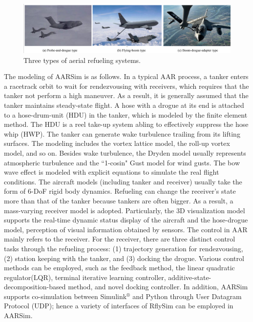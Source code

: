 \begin{figure}[th]
	\centering
	\includegraphics[width=1\textwidth]{Figures/Figs_Ch5/Fig1.pdf}
	\caption{Three types of aerial refueling systems.}\label{FIG_1}
\end{figure}

The modeling of AARSim is as follows. In a typical AAR process, a tanker enters a racetrack orbit to wait for rendezvousing with receivers, which requires that the tanker not perform a high maneuver. As a result, it is generally assumed that the tanker maintains steady-state flight. A hose with a drogue at its end is attached to a hose-drum-unit (HDU) in the tanker, which is modeled by the finite element method\cite{wei2016drogue}. The HDU is a reel take-up system abling to effectively suppress the hose whip (HWP)\cite{ro2011dynamics,wang2014dynamic,dai2019hose,wang2015dynamics}. The tanker can generate wake turbulence trailing from its lifting surfaces. The modeling includes the vortex lattice model, the roll-up vortex model, and so on. Besides wake turbulence, the Dryden\cite{moorhouse1980us} model usually represents atmospheric turbulence and the ``1-cosin" Gust model for wind gusts. The bow wave effect is modeled with explicit equations to simulate the real flight conditions\cite{wei2016drogue,dai2016modeling}. The aircraft models (including tanker and receiver) usually take the form of 6-DoF rigid body dynamics. Refueling can change the receiver's state more than that of the tanker because tankers are often bigger. As a result, a mass-varying receiver model is adopted\cite{ma2018formation}. Particularly, the 3D visualization model supports the real-time dynamic status display of the aircraft and the hose-drogue model, perception of visual\cite{arafat2023vision} information obtained by sensors\cite{parry2023review}. The control in AAR mainly refers to the receiver. For the receiver, there are three distinct control tasks through the refueling process: (1) trajectory generation for rendezvousing, (2) station keeping with the tanker, and (3) docking the drogue. Various control methods can be employed, such as the feedback method, the linear quadratic regulator(LQR), terminal iterative learning controller\cite{dai2018terminal,dai2018iterative}, additive-state-decomposition-based method\cite{jinrui2020docking}, and novel docking controller\cite{LIU2019105403}. In addition, AARSim supports co-simulation between Simulink$^\circledR$ and Python through User Datagram Protocol (UDP); hence a variety of interfaces of RflySim\cite{dai2021rflysim} can be employed in AARSim.


